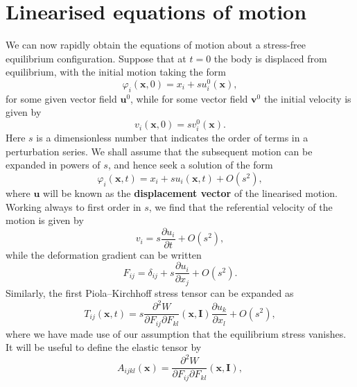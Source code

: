 \section*{Linearised equations of motion}

We can now rapidly obtain the equations of motion about a stress-free equilibrium configuration. Suppose that at $t = 0$ the 
body is displaced from equilibrium, with the initial motion taking the form
\begin{equation}
\varphi_{i}(\mathbf{x}, 0) = x_{i} + s u_{i}^{0}(\mathbf{x}),
\label{eq:23}
\end{equation}
for some given vector field $\mathbf{u}^{0}$, while for some vector field $\mathbf{v}^{0}$ the initial velocity is given by
\begin{equation}
v_{i}(\mathbf{x}, 0) = s v_{i}^{0}(\mathbf{x}).
\label{eq:24}
\end{equation}
Here $s$ is a dimensionless number that indicates the order of terms in a perturbation series. We shall assume that the 
subsequent motion can be expanded in powers of $s$, and hence seek a solution of the form
\begin{equation}
\varphi_{i}(\mathbf{x}, t) = x_{i} + s u_{i}(\mathbf{x}, t) + O(s^2),
\label{eq:25}
\end{equation}
where $\mathbf{u}$ will be known as the \textbf{displacement vector} of the linearised motion. Working always to first order 
in $s$, we find that the referential velocity of the motion is given by
\begin{equation}
v_{i} = s\frac{\partial u_{i}}{\partial t} + O(s^2),
\label{eq:26}
\end{equation}
while the deformation gradient can be written
\begin{equation}
F_{ij} = \delta_{ij} + s\frac{\partial u_{i}}{\partial x_{j}} + O(s^2).
\label{eq:27}
\end{equation}
Similarly, the first Piola--Kirchhoff stress tensor can be expanded as
\begin{equation}
T_{ij}(\mathbf{x}, t) = s\frac{\partial^2 W}{\partial F_{ij}\partial F_{kl}}(\mathbf{x}, \mathbf{I})\frac{\partial u_{k}}{\partial x_{l}} + O(s^2),
\label{eq:28}
\end{equation}
where we have made use of our assumption that the equilibrium stress vanishes. It will be useful to define the elastic tensor by
\begin{equation}
A_{ijkl}(\mathbf{x}) = \frac{\partial^2 W}{\partial F_{ij}\partial F_{kl}}(\mathbf{x}, \mathbf{I}),
\label{eq:29}
\end{equation}
